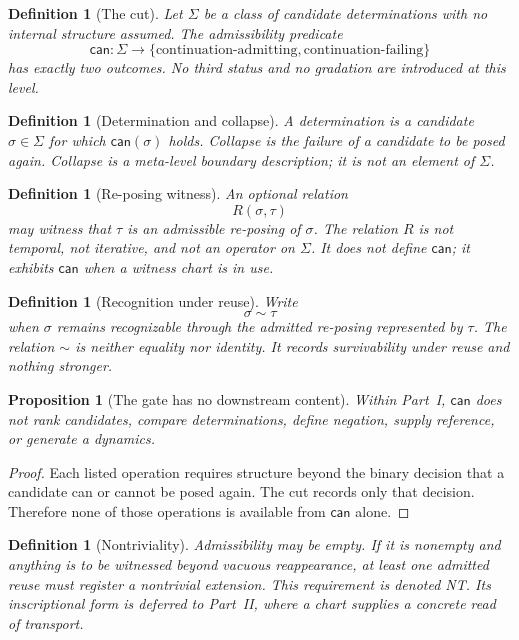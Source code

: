 \documentclass[11pt,letterpaper]{article}
\theoremstyle{constraintstyle}
\newtheorem{proposition}[theorem]{Proposition}
\newtheorem{definition}[theorem]{Definition}
\newcommand{\Can}{\mathsf{can}}
\begin{document}
\begin{definition}[The cut]
Let $\Sigma$ be a class of candidate determinations with no internal structure assumed.  The admissibility predicate
\[
\Can:\Sigma\longrightarrow\{\text{continuation-admitting},\text{continuation-failing}\}
\]
has exactly two outcomes.  No third status and no gradation are introduced at this level.
\end{definition}

\begin{definition}[Determination and collapse]
A \emph{determination} is a candidate $\sigma\in\Sigma$ for which $\Can(\sigma)$ holds.  Collapse is the failure of a candidate to be posed again.  Collapse is a meta-level boundary description; it is not an element of $\Sigma$.
\end{definition}

\begin{definition}[Re-posing witness]
An optional relation
\[
R(\sigma,\tau)
\]
may witness that $\tau$ is an admissible re-posing of $\sigma$.  The relation $R$ is not temporal, not iterative, and not an operator on $\Sigma$.  It does not define $\Can$; it exhibits $\Can$ when a witness chart is in use.
\end{definition}

\begin{definition}[Recognition under reuse]
Write
\[
\sigma\sim\tau
\]
when $\sigma$ remains recognizable through the admitted re-posing represented by $\tau$.  The relation $\sim$ is neither equality nor identity.  It records survivability under reuse and nothing stronger.
\end{definition}

\begin{proposition}[The gate has no downstream content]\label{prop:gate}
Within Part~I, $\Can$ does not rank candidates, compare determinations, define negation, supply reference, or generate a dynamics.
\end{proposition}

\begin{proof}
Each listed operation requires structure beyond the binary decision that a candidate can or cannot be posed again.  The cut records only that decision.  Therefore none of those operations is available from $\Can$ alone.
\end{proof}

\begin{definition}[Nontriviality]
Admissibility may be empty.  If it is nonempty and anything is to be witnessed beyond vacuous reappearance, at least one admitted reuse must register a nontrivial extension.  This requirement is denoted \emph{NT}.  Its inscriptional form is deferred to Part~II, where a chart supplies a concrete read of transport.
\end{definition}
\end{document}
